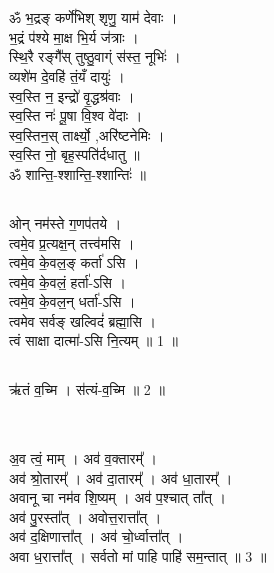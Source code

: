 \section{}
\subsection{}
ॐ भ॒द्रङ् कर्णे॑भिश् शृणु॒ याम॑ देवाः ।\\
भ॒द्रं प॑श्ये मा॒क्ष भि॒र्य ज॑त्राः ।\\
स्थि॒रै रङ्गै᳚स् तुष्ठु॒वाग्ं स॑स्त॒ नूभिः॑ ।\\
व्यशे॑म दे॒वहि॑ तं॒यँ दायुः॑ ।\\
स्व॒स्ति न॒ इन्द्रो॑ वृ॒द्धश्र॑वाः ।\\
स्व॒स्ति नः॑ पू॒षा वि॒श्व वे॑दाः ।\\
स्व॒स्तिन॒स् तार्क्ष्यो॒ ,अरि॑ष्टनेमिः ।\\
स्व॒स्ति नो॒ बृह॒स्पति॑र्दधातु ॥\\
ॐ शान्ति॒-श्शान्ति॒-श्शान्तिः॑ ॥\\
\subsection{}
ओन् नम॑स्ते ग॒णप॑तये ।\\
त्वमे॒व प्र॒त्यक्ष॒न् तत्त्व॑मसि ।\\
त्वमे॒व के॒वल॒ङ् कर्ता॑ ऽसि ।\\
त्वमे॒व के॒वलं॒ हर्ता॑-ऽसि ।\\
त्वमे॒व के॒वल॒न् धर्ता॑-ऽसि ।\\
त्वमेव सर्वङ् खल्विदं॑ ब्रह्मा॒सि ।\\
त्वं साक्षा दात्मा॑-ऽसि नि॒त्यम् ॥ 1 ॥\\
\subsection{}
ऋ॑तं व॒च्मि । स॑त्यं-व॒च्मि ॥ 2 ॥\\
\\
\subsection{}
अ॒व त्वं॒ माम् । अव॑ व॒क्तारम्᳚ ।\\
अव॑ श्रो॒तारम्᳚ । अव॑ दा॒तारम्᳚ । अव॑ धा॒तारम्᳚ ।\\
अवानू चा नम॑व शि॒ष्यम् । अव॑ प॒श्चात् ता᳚त् ।\\
अव॑ पु॒रस्ता᳚त् । अवोत्त॒रात्ता᳚त् ।\\
अव॑ द॒क्षिणात्ता᳚त् । अव॑ चो॒र्ध्वात्ता᳚त् ।\\
अवा ध॒रात्ता᳚त् । सर्वतो मां पाहि पाहि॑ सम॒न्तात् ॥  3 ॥\\
